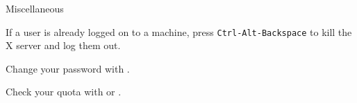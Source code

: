 \begin{block}{Miscellaneous}
  \begin{indented_itemize}
  \item If a user is already logged on to a machine, press \texttt{Ctrl-Alt-Backspace} to kill the X server and log them out.
  \item Change your password with .
  \item Check your quota with  or .
  \end{indented_itemize}
\end{block}
